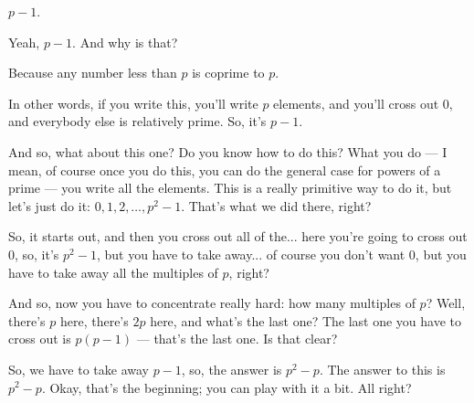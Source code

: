 \begin{student}
$p - 1$.
\end{student}

\begin{speech}[00:12:16 - 00:12:20]
Yeah, $p - 1$. And why is that?
\end{speech}

\begin{student}
Because any number less than $p$ is coprime to $p$.
\end{student}

\begin{speech}[00:12:22 - 00:13:48]
In other words, if you write this, you'll write $p$ elements, and you'll cross out $0$, and everybody else is relatively prime. So, it's $p - 1$. 

And so, what about this one?  Do you know how to do this? What you do --- I mean, of course once you do this, you can do the general case for powers of a prime --- you write all the elements. This is a really primitive way to do it, but let's just do it: $0, 1, 2, \dots, p^2 - 1$.  That's what we did there, right?

So, it starts out, and then you cross out all of the... here you're going to cross out $0$, so, it's $p^2 - 1$, but you have to take away... of course you don't want $0$, but you have to take away all the multiples of $p$, right?

And so, now you have to concentrate really hard: how many multiples of $p$? Well, there's $p$ here, there's $2p$ here, and what's the last one? The last one you have to cross out is $p(p - 1)$ --- that's the last one.  Is that clear?

So, we have to take away $p - 1$, so, the answer is $p^2 - p$.  The answer to this is $p^2 - p$. Okay, that's the beginning; you can play with it a bit. All right?
\end{speech}

